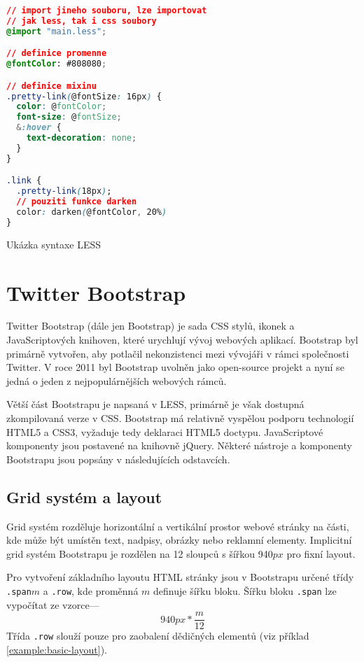 \begin{example}
    \centering
    \begin{lstlisting}[language=css]
// import jineho souboru, lze importovat
// jak less, tak i css soubory
@import "main.less";

// definice promenne
@fontColor: #808080;

// definice mixinu
.pretty-link(@fontSize: 16px) {
  color: @fontColor;
  font-size: @fontSize;
  &:hover {
    text-decoration: none;
  }
}

.link {
  .pretty-link(18px);
  // pouziti funkce darken
  color: darken(@fontColor, 20%)
}
    \end{lstlisting}
    \caption{Ukázka syntaxe LESS}
    \label{example:less-css}
\end{example}

\section{Twitter Bootstrap}
\label{sec:bootsrap}

Twitter Bootstrap (dále jen Bootstrap) je sada CSS stylů, ikonek a JavaScriptových knihoven, které urychlují vývoj webových aplikací. Bootstrap byl primárně vytvořen, aby potlačil nekonzistenci mezi vývojáři v rámci společnosti Twitter. V roce 2011 byl Bootstrap uvolněn jako open-source projekt a nyní se jedná o jeden z nejpopulárnějších webových rámců.

Větší část Bootstrapu je napsaná v LESS, primárně je však dostupná zkompilovaná verze v CSS. Bootstrap má relativně vyspělou podporu technologií HTML5 a CSS3, vyžaduje tedy deklaraci HTML5 doctypu. JavaScriptové komponenty jsou postavené na knihovně jQuery\footnotemark[2]. Některé nástroje a komponenty Bootstrapu jsou popsány v následujících odstavcích.


\subsection{Grid systém a layout}

Grid systém rozděluje horizontální a vertikální prostor webové stránky na části, kde může být umístěn text, nadpisy, obrázky nebo reklamní elementy. Implicitní grid systém Bootstrapu je rozdělen na 12 sloupců s šířkou 940$px$ pro fixní layout.

Pro vytvoření základního layoutu HTML stránky jsou v Bootstrapu určené třídy \texttt{.span}$m$ a \texttt{.row}, kde proměnná $m$ definuje šířku bloku. Šířku bloku \texttt{.span} lze vypočítat ze vzorce---
$$940px * \frac{m}{12}$$
Třída \texttt{.row} slouží pouze pro zaobalení dědičných elementů (viz příklad \ref{example:basic-layout}).

